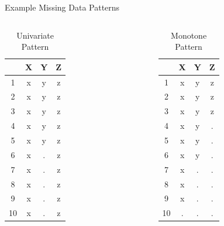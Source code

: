 \documentclass{beamer}\usepackage[]{graphicx}\usepackage[]{color}
\begin{document}
\begin{frame}{Example Missing Data Patterns}



\begin{columns}[T]
  \begin{column}{0.33\textwidth}

\begin{table}[ht]
\centering
\begin{tabular}{cccc}
  \toprule
 & X & Y & Z \\ 
  \midrule
1 & x & y & z \\ 
  2 & x & y & z \\ 
  3 & x & y & z \\ 
  4 & x & y & z \\ 
  5 & x & y & z \\ 
  6 & x & . & z \\ 
  7 & x & . & z \\ 
  8 & x & . & z \\ 
  9 & x & . & z \\ 
  10 & x & . & z \\ 
   \bottomrule
\end{tabular}
\caption{Univariate Pattern} 
\end{table}


\end{column}
\begin{column}{0.33\textwidth}

\begin{table}[ht]
\centering
\begin{tabular}{cccc}
  \toprule
 & X & Y & Z \\ 
  \midrule
1 & x & y & z \\ 
  2 & x & y & z \\ 
  3 & x & y & z \\ 
  4 & x & y & . \\ 
  5 & x & y & . \\ 
  6 & x & y & . \\ 
  7 & x & . & . \\ 
  8 & x & . & . \\ 
  9 & x & . & . \\ 
  10 & . & . & . \\ 
   \bottomrule
\end{tabular}
\caption{Monotone Pattern} 
\end{table}



\end{column}
\end{columns}
\end{frame}
\end{document}
